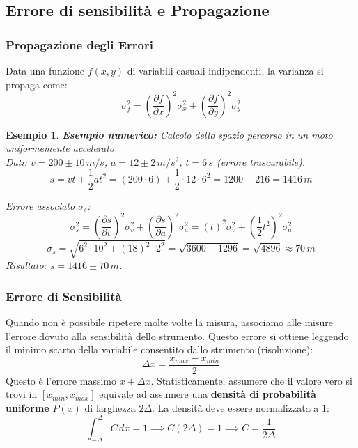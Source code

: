 \documentclass[openany,a4paper,12pt]{book}
\newtheorem*{example}{Esempio}
\theoremstyle{remark}
\begin{document}
\subsection*{Errore di sensibilità e Propagazione}
\subsubsection{Propagazione degli Errori}
Data una funzione $f(x,y)$ di variabili casuali indipendenti, la varianza si propaga come:
\begin{equation}
    \sigma_f^2 = \left( \frac{\partial f}{\partial x} \right)^2 \sigma_x^2 + \left( \frac{\partial f}{\partial y} \right)^2 \sigma_y^2
\end{equation}

\begin{example}
\textbf{Esempio numerico:} Calcolo dello spazio percorso in un moto uniformemente accelerato \\
Dati: $v = 200 \pm 10 \, m/s$, \quad $a = 12 \pm 2 \, m/s^2$, \quad $t = 6 \, s$ (errore trascurabile).
\[ s =  vt + \frac{1}{2}at^2 = (200 \cdot 6) + \frac{1}{2} \cdot 12 \cdot 6^2 = 1200 + 216 = 1416 \, m \]

Errore associato $\sigma_s$:
\[ \sigma_s^2 = \left( \frac{\partial s}{\partial v} \right)^2 \sigma_v^2 + \left( \frac{\partial s}{\partial a} \right)^2 \sigma_a^2 = (t)^2 \sigma_v^2 + \left(\frac{1}{2}t^2\right)^2 \sigma_a^2 \]
\[ \sigma_s = \sqrt{ 6^2 \cdot 10^2 + (18)^2 \cdot 2^2 } = \sqrt{3600 + 1296} = \sqrt{4896} \approx 70 \, m \]
Risultato: $s = 1416 \pm 70 \, m$.

\end{example}




\subsubsection{Errore di Sensibilità}
Quando non è possibile ripetere molte volte la misura, associamo alle misure l'errore dovuto alla sensibilità dello strumento. Questo errore si ottiene leggendo il minimo scarto della variabile consentito dallo strumento (risoluzione):
\[ \Delta x = \frac{x_{max} - x_{min}}{2} \]
Questo è l'errore massimo $x \pm \Delta x$. Statisticamente, assumere che il valore vero si trovi in $[x_{min}, x_{max}]$ equivale ad assumere una \textbf{densità di probabilità uniforme} $P(x)$ di larghezza $2\Delta$.
La densità deve essere normalizzata a 1:
\[ \int_{-\Delta}^{\Delta} C \, dx = 1 \implies C(2\Delta) = 1 \implies C = \frac{1}{2\Delta} \]
\end{document}
